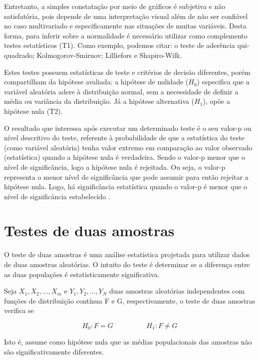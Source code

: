 Entretanto, a simples constatação por meio de gráficos é subjetiva e não satisfatória, pois depende de uma interpretação visual além de não ser confiável no caso multivariado e especificamente nas situações de muitas variáveis. Desta forma, para inferir sobre a normalidade é necessário utilizar como complemento testes estatísticos (T1).  Como exemplo, podemos citar: o teste de aderência qui-quadrado; Kolmogorov-Smirnov; Lilliefors e Shapiro-Wilk. 

Estes testes possuem estatísticas de teste e critérios de decisão diferentes, porém compartilham da hipótese avaliada: a hipótese de nulidade ($H_0$) especifica que a variável aleatória adere à distribuição normal, sem a necessidade de definir a média ou variância da distribuição. Já a hipótese alternativa ($H_1$), opõe a hipótese nula (T2). 

O resultado que interessa após executar um determinado teste é o seu valor-p ou nível descritivo do teste, referente à probabilidade de que a estatística do teste (como variável aleatória) tenha valor extremo em comparação ao valor observado (estatística) quando a hipótese nula é verdadeira. Sendo o valor-p menor que o nível de significância, logo a hipótese nula é rejeitada. Ou seja, o valor-p representa o menor nível de significância que pode assumir para então rejeitar a hipótese nula. Logo, há significância estatística quando o valor-p é menor que o nível de significância estabelecido \cite{FLAVIO2012}.  

\section{Testes de duas amostras}
O teste de duas amostras é uma análise estatística projetada para utilizar dados de duas amostras aleatórias. O intuito do teste é determinar se a diferença entre as duas populações é estatisticamente significativa. 

Seja $X_1, X_2, ..., X_m$ e $Y_1, Y_2, ..., Y_N$ duas amostras aleatórias independentes com funções de distribuição contínua F e G, respectivamente, o teste de duas amostras verifica se

\begin{equation}
 H_0 : F = G  \hspace{2cm} H_1 : F \neq G
\label{eq:twoSample}
\end{equation}

Isto é, assume como hipótese nula que as médias populacionais das amostras não são significativamente diferentes.

